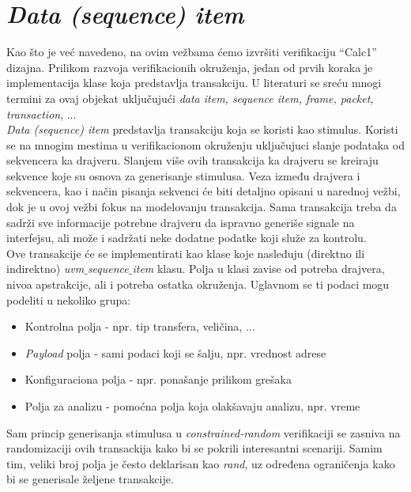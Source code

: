 
\section{\emph{Data (sequence) item}}

Kao što je već navedeno, na ovim vežbama ćemo izvršiti verifikaciju ``Calc1''
dizajna. Prilikom razvoja verifikacionih okruženja, jedan od prvih koraka je
implementacija klase koja predstavlja transakciju. U literaturi se sreću mnogi
termini za ovaj objekat uključujući \emph{data item, sequence item, frame,
  packet, transaction}, ...\\

\emph{Data (sequence) item} predstavlja transakciju koja se koristi kao
stimulus. Koristi se na mnogim mestima u verifikacionom okruženju uključujuci
slanje podataka od sekvencera ka drajveru. Slanjem više ovih transakcija ka
drajveru se kreiraju sekvence koje su osnova za generisanje stimulusa. Veza
između drajvera i sekvencera, kao i način pisanja sekvenci će biti detaljno
opisani u narednoj vežbi, dok je u ovoj vežbi fokus na modelovanju transakcija.
Sama transakcija treba da sadrži sve informacije potrebne drajveru da ispravno
generiše signale na interfejsu, ali može i sadržati neke dodatne podatke koji
služe za kontrolu.\\

Ove transakcije će se implementirati kao klase koje nasleđuju (direktno ili
indirektno) \emph{uvm\(\_\)sequence\(\_\)item} klasu. Polja u klasi zavise od
potreba drajvera, nivoa apstrakcije, ali i potreba ostatka okruženja. Uglavnom
se ti podaci mogu podeliti u nekoliko grupa:

\begin{itemize}
\item Kontrolna polja - npr. tip transfera, veličina, ...
\item \emph{Payload} polja - sami podaci koji se šalju, npr. vrednost adrese
\item Konfiguraciona polja - npr. ponašanje prilikom grešaka
\item Polja za analizu - pomoćna polja koja olakšavaju analizu, npr. vreme
\end{itemize}

Sam princip generisanja stimulusa u \emph{constrained-random} verifikaciji se
zasniva na randomizaciji ovih transackija kako bi se pokrili interesantni
scenariji. Samim tim, veliki broj polja je često deklarisan kao \emph{rand}, uz
određena ograničenja kako bi se generisale željene transakcije.\\

